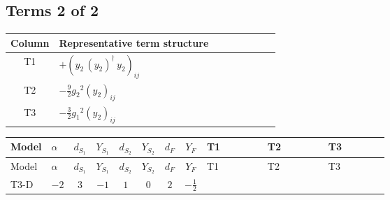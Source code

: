 \documentclass[8pt]{article}
\begin{document}
\begin{landscape}
\subsection*{Terms 2 of 2}
\begin{center}
\begin{tabular}{@{}c >{\raggedright\arraybackslash}p{0.82\linewidth}@{}}
\toprule
Column & Representative term structure \\
\midrule
T1 & \(\displaystyle +\left({y_2}\,\left({y_2}\right)^{\dagger}\,{y_2}\right)_{ij}\) \\
\midrule
T2 & \(\displaystyle -\frac{9}{2} {g_2}^2 \left({y_2}\right)_{ij}\) \\
\midrule
T3 & \(\displaystyle -\frac{3}{2} {g_1}^2 \left({y_2}\right)_{ij}\) \\
\midrule
\bottomrule
\end{tabular}
\end{center}
\smallskip
\tiny
\begin{longtable}{@{}llcccccc >{\raggedright\arraybackslash}p{0.21\linewidth} >{\raggedright\arraybackslash}p{0.21\linewidth} >{\raggedright\arraybackslash}p{0.21\linewidth}@{}}
\toprule
Model & $\alpha$ & $d_{S_1}$ & $Y_{S_1}$ & $d_{S_2}$ & $Y_{S_2}$ & $d_F$ & $Y_F$ & T1 & T2 & T3 \\
\midrule
\endfirsthead
\toprule
Model & $\alpha$ & $d_{S_1}$ & $Y_{S_1}$ & $d_{S_2}$ & $Y_{S_2}$ & $d_F$ & $Y_F$ & T1 & T2 & T3 \\
\midrule
\endhead
T3-D & $-2$ & $3$ & $-1$ & $1$ & $0$ & $2$ & $-\frac{1}{2}$ & \scriptsize\adjustbox{max width=\linewidth}{$\begin{gathered} +\left({y_2}\,\left({y_2}\right)^{\dagger}\,{y_2}\right)_{ij}\end{gathered}$} & \scriptsize\adjustbox{max width=\linewidth}{$\begin{gathered} -\frac{9}{2} {g_2}^2 \left({y_2}\right)_{ij}\end{gathered}$} & \scriptsize\adjustbox{max width=\linewidth}{$\begin{gathered} -\frac{3}{2} {g_1}^2 \left({y_2}\right)_{ij}\end{gathered}$} \\
\midrule
\bottomrule
\end{longtable}
\clearpage

\end{landscape}
\end{document}
